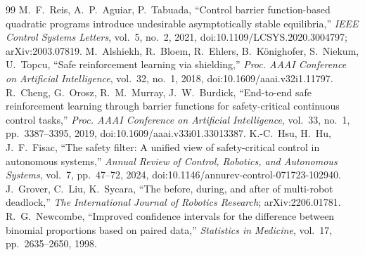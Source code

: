 \documentclass[journal]{IEEEtran}
\begin{document}
\begin{thebibliography}{99}
 M.~F.~Reis, A.~P.~Aguiar, P.~Tabuada, ``Control barrier function-based quadratic programs introduce undesirable asymptotically stable equilibria,'' \emph{IEEE Control Systems Letters}, vol.~5, no.~2, 2021, doi:10.1109/LCSYS.2020.3004797; arXiv:2003.07819.
 M.~Alshiekh, R.~Bloem, R.~Ehlers, B.~K\"onighofer, S.~Niekum, U.~Topcu, ``Safe reinforcement learning via shielding,'' \emph{Proc. AAAI Conference on Artificial Intelligence}, vol.~32, no.~1, 2018, doi:10.1609/aaai.v32i1.11797.
 R.~Cheng, G.~Orosz, R.~M.~Murray, J.~W.~Burdick, ``End-to-end safe reinforcement learning through barrier functions for safety-critical continuous control tasks,'' \emph{Proc. AAAI Conference on Artificial Intelligence}, vol.~33, no.~1, pp.~3387--3395, 2019, doi:10.1609/aaai.v33i01.33013387.
 K.-C.~Hsu, H.~Hu, J.~F.~Fisac, ``The safety filter: A unified view of safety-critical control in autonomous systems,'' \emph{Annual Review of Control, Robotics, and Autonomous Systems}, vol.~7, pp.~47--72, 2024, doi:10.1146/annurev-control-071723-102940.
 J.~Grover, C.~Liu, K.~Sycara, ``The before, during, and after of multi-robot deadlock,'' \emph{The International Journal of Robotics Research}; arXiv:2206.01781.
 R.~G.~Newcombe, ``Improved confidence intervals for the difference between binomial proportions based on paired data,'' \emph{Statistics in Medicine}, vol.~17, pp.~2635--2650, 1998.
\end{thebibliography}
\end{document}

